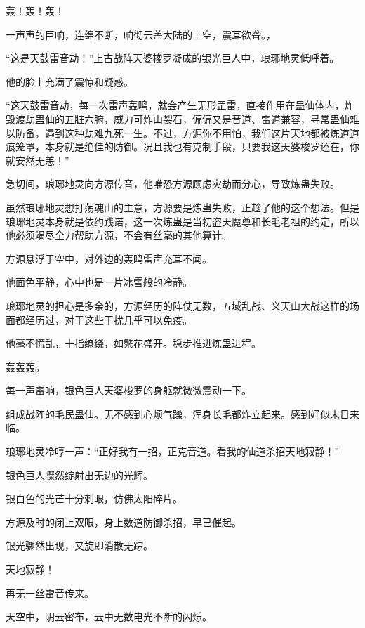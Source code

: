 
\begin{this_body}



轰！轰！轰！

一声声的巨响，连绵不断，响彻云盖大陆的上空，震耳欲聋。，

“这是天鼓雷音劫！”上古战阵天婆梭罗凝成的银光巨人中，琅琊地灵低呼着。

他的脸上充满了震惊和疑惑。

“这天鼓雷音劫，每一次雷声轰鸣，就会产生无形罡雷，直接作用在蛊仙体内，炸毁渡劫蛊仙的五脏六腑，威力可炸山裂石，偏偏又是音道、雷道兼容，寻常蛊仙难以防备，遇到这种劫难九死一生。不过，方源你不用怕，我们这片天地都被炼道道痕笼罩，本身就是绝佳的防御。况且我也有克制手段，只要我这天婆梭罗还在，你就安然无恙！”

急切间，琅琊地灵向方源传音，他唯恐方源顾虑灾劫而分心，导致炼蛊失败。

虽然琅琊地灵想打荡魂山的主意，方源要是炼蛊失败，正趁了他的这个想法。但是琅琊地灵本身就是依约践诺，这一次炼蛊是当初盗天魔尊和长毛老祖的约定，所以他必须竭尽全力帮助方源，不会有丝毫的其他算计。

方源悬浮于空中，对外边的轰鸣雷声充耳不闻。

他面色平静，心中也是一片冰雪般的冷静。

琅琊地灵的担心是多余的，方源经历的阵仗无数，五域乱战、义天山大战这样的场面都经历过，对于这些干扰几乎可以免疫。

他毫不慌乱，十指缭绕，如繁花盛开。稳步推进炼蛊进程。

轰轰轰。

每一声雷响，银色巨人天婆梭罗的身躯就微微震动一下。

组成战阵的毛民蛊仙。无不感到心烦气躁，浑身长毛都炸立起来。感到好似末日来临。

琅琊地灵冷哼一声：“正好我有一招，正克音道。看我的仙道杀招天地寂静！”

银色巨人骤然绽射出无边的光辉。

银白色的光芒十分刺眼，仿佛太阳碎片。

方源及时的闭上双眼，身上数道防御杀招，早已催起。

银光骤然出现，又旋即消散无踪。

天地寂静！

再无一丝雷音传来。

天空中，阴云密布，云中无数电光不断的闪烁。


\end{this_body}
